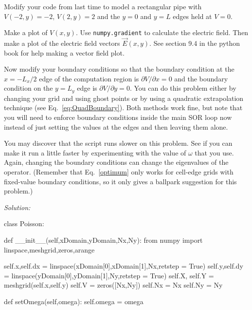 \begin{enumerate}
\probtwo \label{P:20.1} Modify your code from last time to model a
rectangular pipe with $V(-2,y) = -2$, $V(2,y) = 2$ and the $y = 0$ and
$y=L$ edges held at $V = 0$.
\begin{enumerate}
  \subprob Make a plot of $V(x,y)$.  \subprob Use
  \texttt{numpy.gradient} to calculate the electric field.  Then make
    a plot of the electric field vectors $\vec{E}(x,y)$.  See section
    9.4 in the python book for help making a vector field plot.
    
\subprob \label{P:20.1b} Now modify your boundary conditions so
    that the boundary condition at the $x=-L_x/2$ edge of the
    computation region is $\partial V/\partial x=0$ and the boundary
    condition on the $y=L_y$ edge is $\partial V/\partial y=0$. You
    can do this problem either by changing your grid and using ghost
    points or by using a quadratic extrapolation technique (see
    Eq.~\eqref{eq:QuadBoundary}). Both methods work fine, but note
    that you will need to enforce boundary conditions inside the main
    SOR loop now instead of just setting the values at the edges and
    then leaving them alone.


    You may discover that the script runs slower on this
    problem. See if you can make it run a little faster by
    experimenting with the value of $\omega$ that you use.
    Again, changing the boundary conditions can change the
    eigenvalues of the operator. (Remember that
    Eq.~\eqref{optimum} only works for cell-edge grids with
    fixed-value boundary conditions, so it only gives a
    ballpark suggestion for this problem.)

\end{enumerate}
\ifsolutions
\textit{Solution:}\\
\begin{codeexample}
\begin{VerbatimOut}{\listingFile}

class Poisson:

    def __init__(self,xDomain,yDomain,Nx,Ny):
        from numpy import linspace,meshgrid,zeros,arange

 
        self.x,self.dx = linspace(xDomain[0],xDomain[1],Nx,retstep = True)
        self.y,self.dy = linspace(yDomain[0],yDomain[1],Ny,retstep = True)
        self.X, self.Y = meshgrid(self.x,self.y)
        self.V = zeros([Nx,Ny])
        self.Nx = Nx
        self.Ny = Ny

    def setOmega(self,omega):
        self.omega = omega


\end{VerbatimOut}
\end{codeexample}
\end{enumerate}
